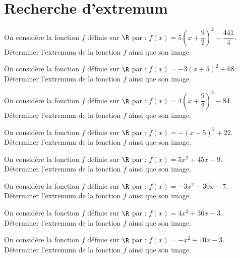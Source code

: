 \documentclass[11pt]{article}
\begin{document}
\section{Recherche d'extremum}

\begin{exercice}
  \begin{enu}
\item On considère la fonction $f$ définie sur $\R$ par : $f(x)=5\left(x +\dfrac{9}{2}\right)^2 -\dfrac{441}{4}$.\\Déterminer l'extremum de la fonction $f$ ainsi que son image. 
	\item On considère la fonction $f$ définie sur $\R$ par : $f(x)=-3\left(x +5\right)^2 +68$.\\Déterminer l'extremum de la fonction $f$ ainsi que son image. 
	\item On considère la fonction $f$ définie sur $\R$ par : $f(x)=4\left(x +\dfrac{9}{2}\right)^2 -84$.\\Déterminer l'extremum de la fonction $f$ ainsi que son image. 
	\item On considère la fonction $f$ définie sur $\R$ par : $f(x)=-\left(x -5\right)^2 +22$.\\Déterminer l'extremum de la fonction $f$ ainsi que son image. 
  \end{enu}
\end{exercice}

\begin{exercice}
  \begin{enu}
    \item On considère la fonction $f$ définie sur $\R$ par : $f(x)=5x^2+45x-9$.\\Déterminer l'extremum de la fonction $f$ ainsi que son image. 
	\item On considère la fonction $f$ définie sur $\R$ par : $f(x)=-3x^2-30x-7$.\\Déterminer l'extremum de la fonction $f$ ainsi que son image. 
	\item On considère la fonction $f$ définie sur $\R$ par : $f(x)=4x^2+36x-3$.\\Déterminer l'extremum de la fonction $f$ ainsi que son image. 
	\item On considère la fonction $f$ définie sur $\R$ par : $f(x)=-x^2+10x-3$.\\Déterminer l'extremum de la fonction $f$ ainsi que son image. 
  \end{enu}
\end{exercice}
\end{document}
